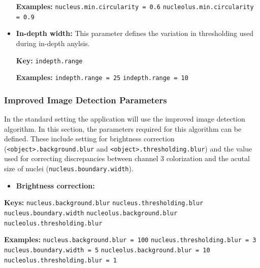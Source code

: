 \documentclass[a4paper, 12pt]{article}
\newcommand{\code}[1]{\colorbox{codegray}{\texttt{#1}}}
\begin{document}
\begin{itemize}
  \textbf{Examples:}
  \newline \code{nucleus.min.circularity = 0.6}
  \newline \code{nucleolus.min.circularity = 0.9}
  
  \item \textbf{In-depth width:} This parameter defines the variation in
  thresholding used during in-depth anylsis.
  
  \textbf{Key:}
  \newline \code{indepth.range}
  
  \textbf{Examples:}
  \newline \code{indepth.range = 25}
  \newline \code{indepth.range = 10}
  
\end{itemize}

\subsubsection{Improved Image Detection Parameters}
In the standard setting the application will use the improved image detection
algorithm. In this section, the parameters required for this algorithm can be
defined. These include setting for brightness correction
(\code{<object>.background.blur} and \code{<object>.thresholding.blur}) and the
value used for correcting discrepancies between channel 3 colorization and the
acutal size of nuclei (\code{nucleus.boundary.width}).

\begin{itemize}
  \item \textbf{Brightness correction:}
\end{itemize}

\textbf{Keys:}
\newline \code{nucleus.background.blur}
\newline \code{nucleus.thresholding.blur}
\newline \code{nucleus.boundary.width}
\newline \code{nucleolus.background.blur}
\newline \code{nucleolus.thresholding.blur}

\textbf{Examples:}
\newline \code{nucleus.background.blur = 100}
\newline \code{nucleus.thresholding.blur = 3}
\newline \code{nucleus.boundary.width = 5}
\newline \code{nucleolus.background.blur = 10}
\newline \code{nucleolus.thresholding.blur = 1}
\end{document}
